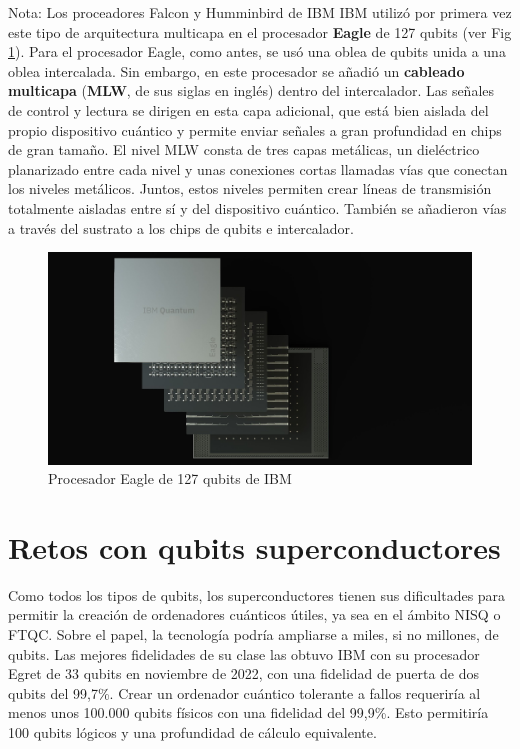 \begin{mybox_blue}{Nota: Los proceadores Falcon y Humminbird de IBM}
IBM utilizó por primera vez este tipo de arquitectura multicapa en el procesador \textbf{Eagle} de 127 qubits (ver Fig \ref{Fig_scq_eagle_127}).  Para el procesador Eagle, como antes, se usó una oblea de qubits unida a una oblea intercalada. Sin embargo, en este procesador se añadió un \textbf{cableado multicapa} (\textbf{MLW}, de sus siglas en inglés) dentro del intercalador. Las señales de control y lectura se dirigen en esta capa adicional, que está bien aislada del propio dispositivo cuántico y permite enviar señales a gran profundidad en chips de gran tamaño.  El nivel MLW consta de tres capas metálicas, un dieléctrico planarizado entre cada nivel y unas conexiones cortas llamadas vías que conectan los niveles metálicos. Juntos, estos niveles permiten crear líneas de transmisión totalmente aisladas entre sí y del dispositivo cuántico. También se añadieron vías a través del sustrato a los chips de qubits e intercalador.
\end{mybox_blue}

	\begin{figure}[t]
	\centering 
	\includegraphics[width=1\linewidth]{Figuras/Fig_scq_eagle_127.jpeg}
	\caption{Procesador Eagle de 127 qubits de IBM}
	\label{Fig_scq_eagle_127}
	\end{figure}



\section{Retos con qubits superconductores}

Como todos los tipos de qubits, los superconductores tienen sus dificultades para permitir la creación de ordenadores cuánticos útiles, ya sea en el ámbito NISQ o FTQC. Sobre el papel, la tecnología podría ampliarse a miles, si no millones, de qubits. Las mejores fidelidades de su clase las obtuvo IBM con su procesador Egret de 33 qubits en noviembre de 2022, con una fidelidad de puerta de dos qubits del 99,7\%. Crear un ordenador cuántico tolerante a fallos requeriría al menos unos 100.000 qubits físicos con una fidelidad del 99,9\%. Esto permitiría 100 qubits lógicos y una profundidad de cálculo equivalente. 

